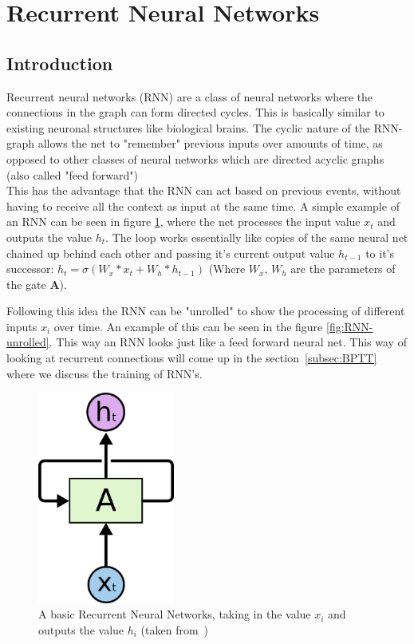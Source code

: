 
\section{Recurrent Neural Networks}

\subsection{Introduction}

Recurrent neural networks (RNN) are a class of neural networks where the connections in the graph can form directed cycles.
This is basically similar to existing neuronal structures like biological brains. 
The cyclic nature of the RNN-graph allows the net to "remember" previous inputs over amounts of time, 
as opposed to other classes of neural networks which are directed acyclic graphs (also called "feed forward")\\

This has the advantage that the RNN can act based on previous events, without having to receive all the context as input at the same time.
A simple example of an RNN can be seen in figure \ref{fig:RNN-rolled}, 
where the net processes the input value $x_t$ and outputs the value $h_t$.
The loop works essentially like copies of the same neural net chained up behind each other and passing it's current
output value $h_{t-1}$ to it's successor: $h_t = \sigma(W_{x} * x_t + W_{h} * h_{t-1})$ 
(Where $W_x$, $W_h$ are the parameters of the gate \textbf{A}).

Following this idea the RNN can be "unrolled" to show the processing of different inputs $x_i$ over time. An example of this can be seen in
the figure \ref{fig:RNN-unrolled}. This way an RNN looks just like a feed forward neural net. This way of looking at recurrent connections
will come up in the section~\ref{subsec:BPTT} where we discuss the training of RNN's.

\begin{figure}
  \begin{center}
    \includegraphics[width=0.4\textwidth]{./img/RNN-rolled}
  \end{center}
  \caption{A basic Recurrent Neural Networks, taking in the value $x_i$ and outputs the value $h_i$ (taken from~\cite{olah:lstm:2015})}
    \label{fig:RNN-rolled}
\end{figure}

